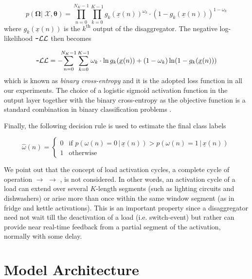 \documentclass[twocolumn,letter,10pt]{IEEEtran} %
\begin{document}
{\small\begin{equation*}
	p\left(\bm{\Omega} |\; \bm{\mathcal{X}}, \bm{\theta} \right) = \prod_{n=0}^{N_K-1} \prod_{k=0}^{K-1} g_k(\underline{x}(n))^{\omega_k} \cdot (1 - g_k(\underline{x}(n)))^{1-\omega_k}
	\end{equation*}}%
where $g_k(\underline{x}(n))$ is the $k^\text{th}$ output of the disaggregator. The negative log-likelihood $\texttt{\textbf{-}}\mathcal{LL}$ then becomes

{\small\begin{equation*}
	\small
	\texttt{\textbf{-}}\mathcal{LL} = -\kern-0.5em\sum_{n=0}^{N_K-1} \sum_{k=0}^{K-1} \omega_k\cdot\ln g_k(\underline{x}(n)) + (1-\omega_k) \ln (1 - g_k(\underline{x}(n)))
	\end{equation*}}%
which is known as \emph{binary cross-entropy} and it is the adopted loss function in all our experiments. The choice of a logistic sigmoid activation function in the output layer together with the binary cross-entropy as the objective function is a standard combination in binary classification problems \cite{Bishop_2006}.

Finally, the following decision rule is used to estimate the final class labels

{\small\begin{equation*}
	\hat{\omega}(n)=
	\begin{cases}
	0 & \text{if } p(\omega(n) = 0\,|\,\underline{x}(n)) > p(\omega(n) = 1\,|\,\underline{x}(n)) \\[1mm]
	1 & \text{otherwise}
	\end{cases}
	\end{equation*}}%

We point out that the concept of load activation cycles, a complete cycle of operation \off $\rightarrow$ \on $\rightarrow$ \off, is not considered. In other words, an activation cycle of a load can extend over several $K$-length segments (such as lighting circuits and dishwashers) or arise more than once within the same window segment (as in fridge and kettle activations). This is an important property since a disaggregator need not wait till the deactivation of a load (i.e. switch-\off event) but rather can provide {near} real-time feedback from a partial segment of the activation, normally with some delay. 

\section{Model Architecture}
\label{sec:model-selection}
\end{document}
